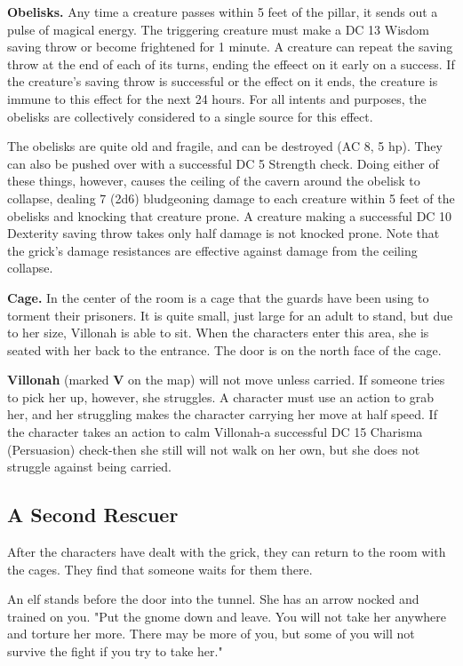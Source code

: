 \documentclass[10pt,a4paper,twoside,bg=print,twocolumn,openany,nodeprecatedcode]{dndbook}
\begin{document}
\textbf{Obelisks.} Any time a creature passes within 5 feet of the pillar, it sends out a pulse of magical energy. The triggering creature must make a DC 13 Wisdom saving throw or become frightened for 1 minute. A creature can repeat the saving throw at the end of each of its turns, ending the effeect on it early on a success. If the creature's saving throw is successful or the effect on it ends, the creature is immune to this effect for the next 24 hours. For all intents and purposes, the obelisks are collectively considered to a single source for this effect.

The obelisks are quite old and fragile, and can be destroyed (AC 8, 5 hp). They can also be pushed over with a successful DC 5 Strength check. Doing either of these things, however, causes the ceiling of the cavern around the obelisk to collapse, dealing 7 (2d6) bludgeoning damage to each creature within 5 feet of the obelisks and knocking that creature prone. A creature making a successful DC 10 Dexterity saving throw takes only half damage is not knocked prone. Note that the grick's damage resistances are effective against damage from the ceiling collapse.

\textbf{Cage.} In the center of the room is a cage that the guards have been using to torment their prisoners. It is quite small, just large for an adult to stand, but due to her size, Villonah is able to sit. When the characters enter this area, she is seated with her back to the entrance. The door is on the north face of the cage.

\textbf{Villonah} (marked \textbf{V} on the map) will not move unless carried. If someone tries to pick her up, however, she struggles. A character must use an action to grab her, and her struggling makes the character carrying her move at half speed. If the character takes an action to calm Villonah-a successful DC 15 Charisma (Persuasion) check-then she still will not walk on her own, but she does not struggle against being carried.

\subsection{A Second Rescuer}
After the characters have dealt with the grick, they can return to the room with the cages. They find that someone waits for them there.

\begin{DndReadAloud}{}
An elf stands before the door into the tunnel. She has an arrow nocked and trained on you. "Put the gnome down and leave. You will not take her anywhere and torture her more. There may be more of you, but some of you will not survive the fight if you try to take her."

\end{DndReadAloud}
\end{document}
